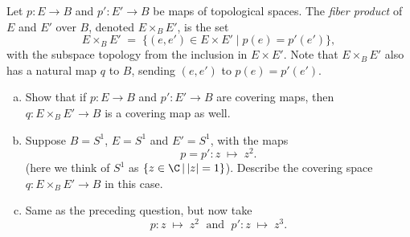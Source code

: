 \documentclass[11pt,letterpaper]{article}
\begin{document}
\begin{problem}
    Let $p : E \to B$ and $p' : E' \to B$ be maps of topological spaces. The \emph{fiber product}  of $E$ and $E'$ over $B$, denoted $E \times_B E'$, is the set
    \[
        E \times_B E' \; = \; \{ (e, e') \in E \times E' \mid p(e) = p'(e') \},
    \] 
    with the subspace topology from the inclusion in $E \times E'$. Note that $E \times_B E'$ also has a natural map $q$ to $B$, sending $(e,e')$ to $p(e) = p'(e')$.
    \begin{enumerate}[(a)]
        \item Show that if $p : E \to B$ and $p' : E' \to B$ are covering maps, then $q : E \times_B E' \to B$ is a covering map as well. 
        \item Suppose $B = S^1$, $E = S^1$ and $E' = S^1$, with the maps
        \[
            p = p' : z \; \mapsto \; z^2
        .\] 
        (here we think of $S^1$ as $\{z\in\C\,|\,|z|=1\}$). Describe the covering space $q : E \times_B E' \to B$ in this case.
        \item Same as the preceding question, but now take
        \[
            p : z \; \mapsto \; z^2 \;  \text{ and } \; p' : z \; \mapsto \; z^3.
        \]
    \end{enumerate}
\end{problem}
\end{document}

